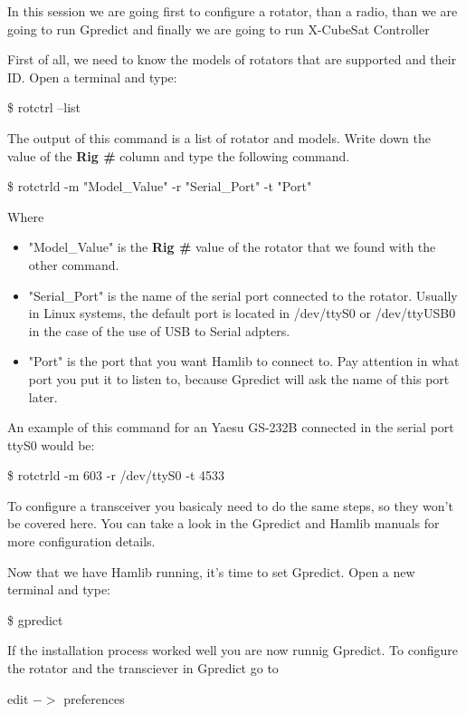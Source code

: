 \documentclass[pdftex,11pt,a4paper,titlepage]{report}
\begin{document}
In this session we are going first to configure a rotator, than a radio, than we are going to run Gpredict and finally we are going to run X-CubeSat Controller

First of all, we need to know the models of rotators that are supported and their ID. Open a terminal and type:
\begin{framed}
\$ rotctrl --list
\end{framed}

The output of this command is a list of rotator and models. Write down the value of the \textbf{Rig \#} column and type the following command.

\begin{framed}
\$ rotctrld -m "Model\_Value" -r "Serial\_Port" -t  "Port"
\end{framed}

Where 
\begin{itemize}
\item "Model\_Value" is the \textbf{Rig \#} value of the rotator that we found with the other command.
\item "Serial\_Port" is the name of the serial port connected to the rotator. Usually in Linux systems, the default port is located in /dev/ttyS0 or /dev/ttyUSB0 in the case of the use of USB to Serial adpters.
\item "Port" is the port that you want Hamlib to connect to. Pay attention in what port you put it to listen to, because Gpredict will ask the name of this port later. 
\end{itemize}

An example of this command for an Yaesu GS-232B connected in the serial port ttyS0 would be:
\begin{framed}
\$ rotctrld -m 603 -r /dev/ttyS0 -t 4533
\end{framed}

To configure a transceiver you basicaly need to do the same steps, so they won't be covered here. You can take a look in the Gpredict and Hamlib manuals for more configuration details.

Now that we have Hamlib running, it's time to set Gpredict. Open a new terminal and type:
\begin{framed}
\$ gpredict
\end{framed}
If the installation process worked well you are now runnig Gpredict. To configure the rotator and the transciever in Gpredict go to
\begin{framed}
edit $->$ preferences
\end{framed}
\end{document}
